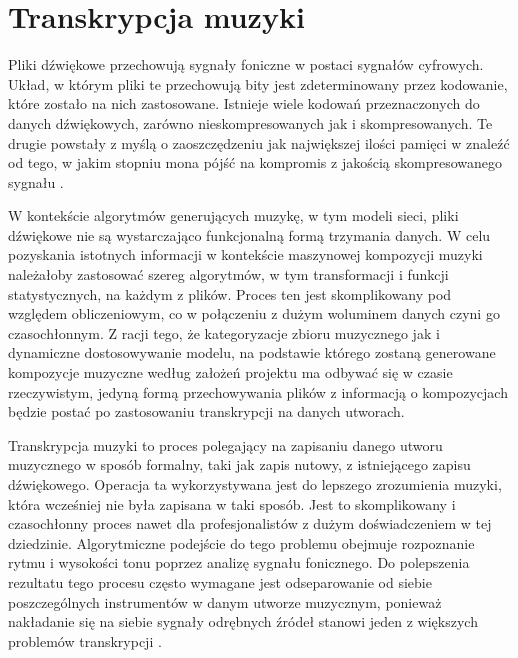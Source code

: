 \documentclass[12pt,a4paper,twoside]{mwart}
\begin{document}
\section{Transkrypcja muzyki}
Pliki dźwiękowe przechowują sygnały foniczne w postaci sygnałów cyfrowych. Układ, w którym pliki te przechowują bity jest zdeterminowany przez kodowanie, które zostało na nich zastosowane. Istnieje wiele kodowań przeznaczonych do danych dźwiękowych, zarówno nieskompresowanych jak i skompresowanych. Te drugie powstały z myślą o zaoszczędzeniu jak największej ilości pamięci w znaleźć od tego, w jakim stopniu mona pójść na kompromis z jakością skompresowanego sygnału \cite[66]{Homerecording:DlaKazdego}.

W kontekście algorytmów generujących muzykę, w tym modeli sieci, pliki dźwiękowe nie są wystarczająco funkcjonalną formą trzymania danych. W celu pozyskania istotnych informacji w kontekście maszynowej kompozycji muzyki należałoby zastosować szereg algorytmów, w tym transformacji i funkcji statystycznych, na każdym z plików. Proces ten jest skomplikowany pod względem obliczeniowym, co w połączeniu z dużym woluminem danych czyni go czasochłonnym. Z racji tego, że kategoryzacje zbioru muzycznego jak i dynamiczne dostosowywanie modelu, na podstawie którego zostaną generowane kompozycje muzyczne według założeń projektu ma odbywać się w czasie rzeczywistym, jedyną formą przechowywania plików z informacją o kompozycjach będzie postać po zastosowaniu transkrypcji na danych utworach.


Transkrypcja muzyki to proces polegający na zapisaniu danego utworu muzycznego w sposób formalny, taki jak zapis nutowy, z istniejącego zapisu dźwiękowego. Operacja ta wykorzystywana jest do lepszego zrozumienia muzyki, która wcześniej nie była zapisana w taki sposób. Jest to skomplikowany i czasochłonny proces nawet dla profesjonalistów z dużym doświadczeniem w tej dziedzinie. Algorytmiczne podejście do tego problemu obejmuje rozpoznanie rytmu i wysokości tonu poprzez analizę sygnału fonicznego. Do polepszenia rezultatu tego procesu często wymagane jest odseparowanie od siebie poszczególnych instrumentów w danym utworze muzycznym, ponieważ nakładanie się na siebie sygnały odrębnych źródeł stanowi jeden z większych problemów transkrypcji \cite[67]{Homerecording:LevelUp}. 
\end{document}
